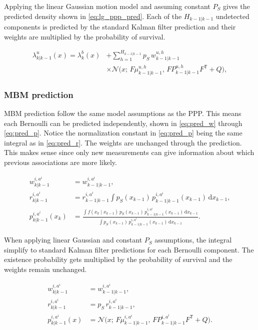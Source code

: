 Applying the linear Gaussian motion model and assuming constant $P_S$ gives the predicted density shown in \autoref{eq:lg_ppp_pred}. Each of the ${H_{k-1|k-1}}$ undetected components is predicted by the standard Kalman filter prediction and their weights are multiplied by the probability of survival. 

\begin{equation}
\begin{split}
  \lambda^u_{k|k-1}(x) = \lambda^b_k(x)
    &+ \sum_{h=1}^{H_{k-1|k-1}} p_S\, w^{u,h}_{k-1|k-1} \\
    &\times \mathcal{N}\big(x;\, F \mu^{u,h}_{k-1|k-1},\,
      F P^{u,h}_{k-1|k-1} F^{\mathsf{T}} + Q\big),
\end{split}
\label{eq:lg_ppp_pred}
\end{equation}

\subsubsection{MBM prediction}
MBM prediction follow the same model assumptions as the PPP. This means each Bernoulli can be predicted independently, shown in \autoref{eq:pred_w} through \ref{eq:pred_p}. Notice the normalization constant in \autoref{eq:pred_p} being the same integral as in \autoref{eq:pred_r}. The weights are unchanged through the prediction. This makes sense since only new measurements can give information about which previous associations are more likely. 

\begin{align}
  w^{i,a^i}_{k|k-1} &= w^{i,a^i}_{k-1|k-1}, \label{eq:pred_w} \\
  r^{i,a^i}_{k|k-1} &= r^{i,a^i}_{k-1|k-1}
    \int p_S(x_{k-1})\, p^{i,a^i}_{k-1|k-1}(x_{k-1})\,\mathrm{d}x_{k-1}, \label{eq:pred_r} \\
  p^{i,a^i}_{k|k-1}(x_k) &=
    \frac{\int f(x_k \mid x_{k-1})\, p_S(x_{k-1})\, p^{i,a^i}_{k-1|k-1}(x_{k-1})\,\mathrm{d}x_{k-1}}
         {\int p_S(x_{k-1})\, p^{i,a^i}_{k-1|k-1}(x_{k-1})\,\mathrm{d}x_{k-1}}. \label{eq:pred_p}
\end{align}

When applying linear Gaussian and constant $P_S$ assumptions, the integral simplify to standard Kalman filter predictions for each Bernoulli component. The existence probability gets multiplied by the probability of survival and the weights remain unchanged.

\begin{align*}
  w^{i,a^i}_{k|k-1} &= w^{i,a^i}_{k-1|k-1}, \\
  r^{i,a^i}_{k|k-1} &= p_S\, r^{i,a^i}_{k-1|k-1}, \\
  p^{i,a^i}_{k|k-1}(x) &= \mathcal{N}\big(x;\, F \mu^{i,a^i}_{k-1|k-1},\,
    F P^{i,a^i}_{k-1|k-1} F^{\mathsf{T}} + Q\big).
\end{align*}

